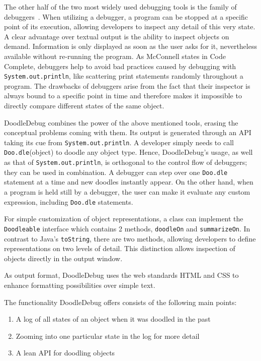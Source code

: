 \documentclass[english]{scrartcl}
\newcommand{\DD}{Dood\-le\-De\-bug\xspace}
\newcommand{\Doodle}{\texttt{Doo.\-dle}\xspace}
\newcommand{\println}{\texttt{Sys\-tem.\-out.\-println}\xspace}
\begin{document}
The other half of the two most widely used debugging tools is the family of debuggers~\cite{Kras88a}.
When utilizing a debugger, a program can be stopped at a specific point of its execution, allowing developers to inspect any detail of this very state.
A clear advantage over textual output is the ability to inspect objects on demand.
Information is only displayed as soon as the user asks for it, nevertheless available without re-running the program.
As McConnell states in Code Complete\cite[p. 539]{McCo04a}, debuggers help to avoid bad practices caused by debugging with \println, like scattering print statements randomly throughout a program.
The drawbacks of debuggers arise from the fact that their inspector is always bound to a specific point in time and therefore makes it impossible to directly compare different states of the same object.

\DD combines the power of the above mentioned tools, erasing the conceptual problems coming with them.
Its output is generated through an API taking its cue from \println.
A developer simply needs to call \Doodle(object) to doodle any object type.
Hence, \DD's usage, as well as that of \println, is orthogonal to the control flow of debuggers; they can be used in combination.
A debugger can step over one \Doodle statement at a time and new doodles instantly appear.
On the other hand, when a program is held still by a debugger, the user can make it evaluate any custom expression, including \Doodle statements.

For simple customization of object representations, a class can implement the \texttt{Doodleable} interface which contains 2 methods, \texttt{doodleOn} and \texttt{summarizeOn}.
In contrast to Java's \texttt{toString}, there are two methods, allowing developers to define representations on two levels of detail.
This distinction allows inspection of objects directly in the output window.

As output format, \DD uses the web standards HTML and CSS to enhance formatting possibilities over simple text.

The functionality \DD offers consists of the following main points:
\begin{enumerate}
\item A log of all states of an object when it was doodled in the past
\item Zooming into one particular state in the log for more detail
\item A lean API for doodling objects
\end{enumerate}
\end{document}
